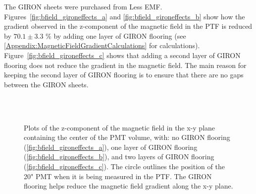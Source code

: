 The GIRON sheets were purchased from Less EMF. Figures~\ref{fig:bfield_gironeffects_a} and \ref{fig:bfield_gironeffects_b} show how the gradient observed in the z-component of the magnetic field in the PTF is reduced by $ 70.1\pm3.3 $ \% by adding one layer of GIRON flooring (see \ref{Appendix:MagneticFieldGradientCalculations} for calculations).
Figure~\ref{fig:bfield_gironeffects_c} shows that adding a second layer of GIRON flooring does not reduce the gradient in the magnetic field. The main reason for keeping the second layer of GIRON flooring is to ensure that there are no gaps between the GIRON sheets.
%
\begin{figure}[htbp]
  \begin{center}
    \\
    \vspace{-3 mm}
    \\
    \vspace{-3 mm}
  \caption{Plots of the z-component of the magnetic field in the x-y plane containing the center of the PMT volume, with: no GIRON flooring (\ref{fig:bfield_gironeffects_a}), one layer of GIRON flooring (\ref{fig:bfield_gironeffects_b}), and two layers of GIRON flooring (\ref{fig:bfield_gironeffects_c}). The circle outlines the position of the 20" PMT when it is being measured in the PTF. The GIRON flooring helps reduce the magnetic field gradient along the x-y plane.}
  \label{fig:bfield_gironeffects}
  \end{center}
\end{figure}
%


